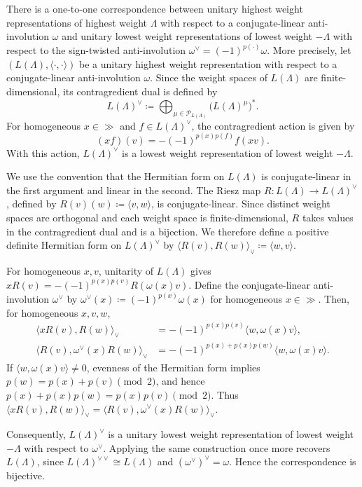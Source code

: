 \begin{remark}\label{rmk::HW_LW}
There is a one-to-one correspondence between unitary highest weight representations of highest weight $\Lambda$ with respect to a conjugate-linear anti-involution $\omega$ and unitary lowest weight representations of lowest weight $-\Lambda$ with respect to the sign-twisted anti-involution $\omega^{\vee}=(-1)^{p(\cdot)}\omega$. More precisely, let $(L(\Lambda),\langle\cdot,\cdot\rangle)$ be a unitary highest weight representation
with respect to a conjugate-linear anti-involution $\omega$. Since the
weight spaces of $L(\Lambda)$ are finite-dimensional, its contragredient
dual is defined by
\[
 L(\Lambda)^{\vee}
 \coloneqq
 \bigoplus_{\mu\in\mathcal{P}_{L(\Lambda)}}
 \bigl(L(\Lambda)^{\mu}\bigr)^{*}.
\]
For homogeneous $x\in\gg$ and $f\in L(\Lambda)^{\vee}$, the
contragredient action is given by
\[
 (xf)(v)
 =
 -(-1)^{p(x)p(f)}f(xv).
\]
With this action, $L(\Lambda)^{\vee}$ is a lowest weight representation
of lowest weight $-\Lambda$.

We use the convention that the Hermitian form on $L(\Lambda)$ is
conjugate-linear in the first argument and linear in the second. The
Riesz map $R\colon L(\Lambda)\to L(\Lambda)^{\vee}$, defined by
$R(v)(w)\coloneqq\langle v,w\rangle$, is conjugate-linear. Since
distinct weight spaces are orthogonal and each weight space is
finite-dimensional, $R$ takes values in the contragredient dual and is
a bijection. We therefore define a positive definite Hermitian form on
$L(\Lambda)^{\vee}$ by
$\langle R(v),R(w)\rangle_{\vee}\coloneqq\langle w,v\rangle$.

For homogeneous $x,v$, unitarity of $L(\Lambda)$ gives
$xR(v)=-(-1)^{p(x)p(v)}R(\omega(x)v)$. Define the conjugate-linear
anti-involution $\omega^{\vee}$ by
$\omega^{\vee}(x)\coloneqq(-1)^{p(x)}\omega(x)$ for homogeneous
$x\in\gg$. Then, for homogeneous $x,v,w$,
\[
\begin{aligned}
 \langle xR(v),R(w)\rangle_{\vee}
 &=
 -(-1)^{p(x)p(v)}
 \langle w,\omega(x)v\rangle,\\
 \langle R(v),\omega^{\vee}(x)R(w)\rangle_{\vee}
 &=
 -(-1)^{p(x)+p(x)p(w)}
 \langle w,\omega(x)v\rangle.
\end{aligned}
\]
If $\langle w,\omega(x)v\rangle\neq0$, evenness of the Hermitian form
implies $p(w)=p(x)+p(v)\pmod 2$, and hence
$p(x)+p(x)p(w)=p(x)p(v)\pmod 2$. Thus
$\langle xR(v),R(w)\rangle_{\vee}
=\langle R(v),\omega^{\vee}(x)R(w)\rangle_{\vee}$.

Consequently, $L(\Lambda)^{\vee}$ is a unitary lowest weight
representation of lowest weight $-\Lambda$ with respect to
$\omega^{\vee}$. Applying the same construction once more recovers
$L(\Lambda)$, since $L(\Lambda)^{\vee\vee}\cong L(\Lambda)$ and
$(\omega^{\vee})^{\vee}=\omega$. Hence the correspondence is
bijective.
\end{remark}

